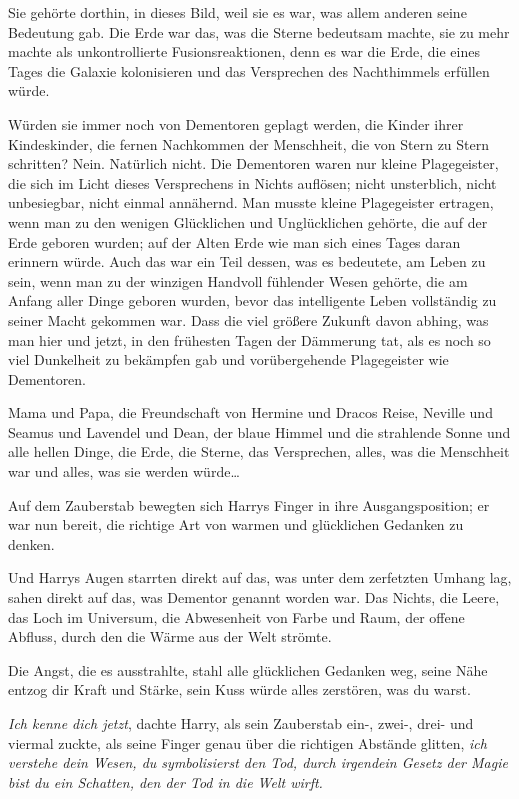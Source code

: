 {Sie gehörte dorthin, in dieses Bild, weil sie es war, was allem anderen seine Bedeutung gab. Die Erde war das, was die Sterne bedeutsam machte, sie zu mehr machte als unkontrollierte Fusionsreaktionen, denn es war die Erde, die eines Tages die Galaxie kolonisieren und das Versprechen des Nachthimmels erfüllen würde.

Würden sie immer noch von Dementoren geplagt werden, die Kinder ihrer Kindeskinder, die fernen Nachkommen der Menschheit, die von Stern zu Stern schritten? Nein. Natürlich nicht. Die Dementoren waren nur kleine Plagegeister, die sich im Licht dieses Versprechens in Nichts auflösen; nicht unsterblich, nicht unbesiegbar, nicht einmal annähernd. Man musste kleine Plagegeister ertragen, wenn man zu den wenigen Glücklichen und Unglücklichen gehörte, die auf der Erde geboren wurden; auf der Alten Erde wie man sich eines Tages daran erinnern würde. Auch das war ein Teil dessen, was es bedeutete, am Leben zu sein, wenn man zu der winzigen Handvoll fühlender Wesen gehörte, die am Anfang aller Dinge geboren wurden, bevor das intelligente Leben vollständig zu seiner Macht gekommen war. Dass die viel größere Zukunft davon abhing, was man hier und jetzt, in den frühesten Tagen der Dämmerung tat, als es noch so viel Dunkelheit zu bekämpfen gab und vorübergehende Plagegeister wie Dementoren.

Mama und Papa, die Freundschaft von Hermine und Dracos Reise, Neville und Seamus und Lavendel und Dean, der blaue Himmel und die strahlende Sonne und alle hellen Dinge, die Erde, die Sterne, das Versprechen, alles, was die Menschheit war und alles, was sie werden würde…

Auf dem Zauberstab bewegten sich Harrys Finger in ihre Ausgangsposition; er war nun bereit, die richtige Art von warmen und glücklichen Gedanken zu denken.

Und Harrys Augen starrten direkt auf das, was unter dem zerfetzten Umhang lag, sahen direkt auf das, was Dementor genannt worden war. Das Nichts, die Leere, das Loch im Universum, die Abwesenheit von Farbe und Raum, der offene Abfluss, durch den die Wärme aus der Welt strömte.

Die Angst, die es ausstrahlte, stahl alle glücklichen Gedanken weg, seine Nähe entzog dir Kraft und Stärke, sein Kuss würde alles zerstören, was du warst.

\emph{Ich kenne dich jetzt}, dachte Harry, als sein Zauberstab ein-, zwei-, drei- und viermal zuckte, als seine Finger genau über die richtigen Abstände glitten, \emph{ich verstehe dein Wesen, du symbolisierst den Tod, durch irgendein Gesetz der Magie bist du ein Schatten, den der Tod in die Welt wirft.}

}

